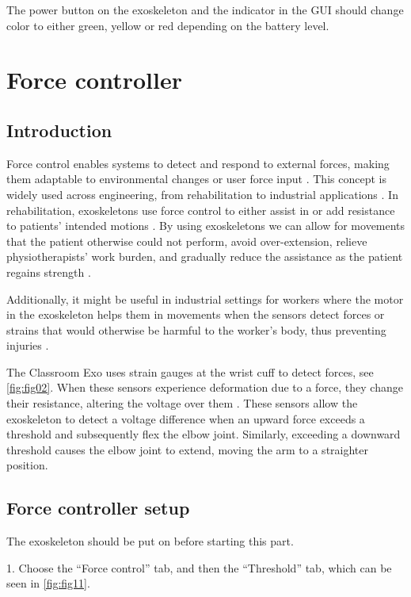 The power button on the exoskeleton and the indicator in the GUI should change color to either green, yellow or red depending on the battery level.


\newpage
\section{Force controller}
\subsection{Introduction}



Force control enables systems to detect and respond to external forces, making them adaptable to environmental changes or user force input \cite{Falkowski2024}. This concept is widely used across engineering, from rehabilitation to industrial applications \cite{Lang2022}. In rehabilitation, exoskeletons use force control to either assist in or add resistance to patients' intended motions \cite{Falkowski2024}. By using exoskeletons we can allow for movements that the patient otherwise could not perform, avoid over-extension, relieve physiotherapists' work burden, and gradually reduce the assistance as the patient regains strength \cite{Falkowski2024, Dickmann2021}.

Additionally, it might be useful in industrial settings for workers where the motor in the exoskeleton helps them in movements when the sensors detect forces or strains that would otherwise be harmful to the worker's body, thus preventing injuries \cite{Golabchi2022}. 

The Classroom Exo uses strain gauges at the wrist cuff to detect forces, see \autoref{fig:fig02}. When these sensors experience deformation due to a force, they change their resistance, altering the voltage over them \cite{AlTashi2024}. These sensors allow the exoskeleton to detect a voltage difference when an upward force exceeds a threshold and subsequently flex the elbow joint. Similarly, exceeding a downward threshold causes the elbow joint to extend, moving the arm to a straighter position.

\subsection{Force controller setup}
The exoskeleton should be put on before starting this part.

1.	Choose the “Force control” tab, and then the “Threshold” tab, which can be seen in \autoref{fig:fig11}.



